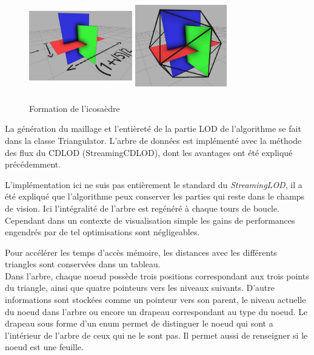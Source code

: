 	\begin{figure}[H]
        \centerline{
            \includegraphics[height=4cm,width=4.5cm]{img/3plans.png}
            \includegraphics[height=4cm,width=4cm]{img/3plans2.png}}
        \caption{Formation de l'icosaèdre \protect\footnotemark}
        \label{fig:plans-icosaèdre}
	\end{figure}
	
	
	
	La génération du maillage et l'entièreté de la partie LOD de l'algorithme se fait dans la classe Triangulator. L'arbre de données est implémenté avec la méthode des flux du CDLOD (StreamingCDLOD), dont les avantages ont été expliqué précédemment.
	
	L'implémentation ici ne suis pas entièrement le standard du \textit{StreamingLOD}, il a été expliqué que l'algorithme peux conserver les parties qui reste dans le champs de vision. Ici l'intégralité de l'arbre est regénéré à chaque tours de boucle. Cependant dans un contexte de visualisation simple les gains de performances engendrés par de tel optimisations sont négligeables.
	
	Pour accélérer les temps d'accès mémoire, les distances avec les différents triangles sont conservées
	dans un tableau. \\

	Dans l'arbre, chaque noeud possède trois positions correspondant aux trois points du triangle,
	ainsi que quatre pointeurs vers les niveaux suivants.
	D'autre informations sont stockées comme un pointeur vers son parent, le niveau actuelle du
	noeud dans l'arbre ou encore un drapeau correspondant au type du noeud.
	Le drapeau sous forme d'un enum permet de distinguer le noeud qui sont a l'intérieur de l'arbre de ceux
	qui ne le sont pas. Il permet aussi de renseigner si le noeud est une feuille.
		
